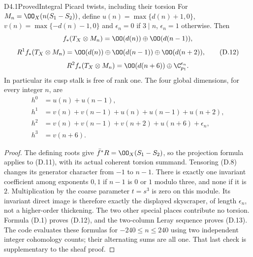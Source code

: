 \begin{claim}{D4.1}{Proved}{Integral Picard twists, including their torsion}
For $M_n=\OO_X(n(S_1-S_2))$, define
$u(n)=\max\{d(n)+1,0\}$, $v(n)=\max\{-d(n)-1,0\}$ and
$\epsilon_n=0$ if $3\mid n$, $\epsilon_n=1$ otherwise. Then
\[
 f_*(T_X\otimes M_n)=\OO(d(n))\oplus\OO(d(n-1)),
\]
\[
 R^1f_*(T_X\otimes M_n)=
 \OO(d(n))\oplus\OO(d(n-1))\oplus\OO(d(n+2)),           \tag{D.12}
\]
\[
 R^2f_*(T_X\otimes M_n)=
 \OO(d(n+6))\oplus\C_{p_1}^{\epsilon_n}.
\]
In particular its cusp stalk is free of rank one. The four global
dimensions, for every integer $n$, are
\begin{align*}
 h^0&=u(n)+u(n-1),\\
 h^1&=v(n)+v(n-1)+u(n)+u(n-1)+u(n+2),\\
 h^2&=v(n)+v(n-1)+v(n+2)+u(n+6)+\epsilon_n,\\
 h^3&=v(n+6).                                          \tag{D.13}
\end{align*}
\end{claim}
\begin{proof}
The defining roots give $\bar f^*R=\OO_X(S_1-S_2)$, so the projection
formula applies to (D.11), with its actual coherent torsion summand.
Tensoring (D.8) changes its generator character from $-1$ to $n-1$.
There is exactly one invariant coefficient among exponents $0,1$ if
$n-1$ is $0$ or $1$ modulo three, and none if it is $2$. Multiplication
by the coarse parameter $t=s^3$ is zero on this module. Its invariant
direct image is therefore exactly the displayed skyscraper, of
length $\epsilon_n$, not a higher-order thickening. The two other
special places contribute no torsion. Formula (D.1) proves (D.12),
and the two-column Leray sequence proves (D.13). The code evaluates
these formulas for $-240\le n\le240$ using two independent integer
cohomology counts; their alternating sums are all one. That last
check is supplementary to the sheaf proof.
\end{proof}
